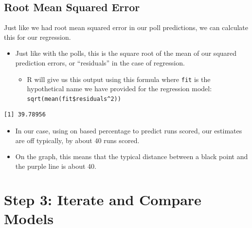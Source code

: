 \documentclass[
  letterpaper,
  DIV=11,
  numbers=noendperiod]{scrreprt}
\newenvironment{Shaded}{\begin{snugshade}}{\end{snugshade}}
\newcommand{\DecValTok}[1]{\textcolor[rgb]{0.68,0.00,0.00}{#1}}
\newcommand{\FunctionTok}[1]{\textcolor[rgb]{0.28,0.35,0.67}{#1}}
\newcommand{\NormalTok}[1]{\textcolor[rgb]{0.00,0.23,0.31}{#1}}
\newcommand{\SpecialCharTok}[1]{\textcolor[rgb]{0.37,0.37,0.37}{#1}}
\providecommand{\tightlist}{%
  \setlength{\itemsep}{0pt}\setlength{\parskip}{0pt}}\usepackage{longtable,booktabs,array}
\begin{document}
\hypertarget{root-mean-squared-error}{%
\subsection{Root Mean Squared Error}\label{root-mean-squared-error}}

Just like we had root mean squared error in our poll predictions, we can
calculate this for our regression.

\begin{itemize}
\tightlist
\item
  Just like with the polls, this is the square root of the mean of our
  squared prediction errors, or ``residuals'' in the case of regression.

  \begin{itemize}
  \tightlist
  \item
    R will give us this output using this formula where \texttt{fit} is
    the hypothetical name we have provided for the regression model:
    \texttt{sqrt(mean(fit\$residuals\^{}2))}
  \end{itemize}
\end{itemize}

\begin{Shaded}
\end{Shaded}

\begin{verbatim}
[1] 39.78956
\end{verbatim}

\begin{itemize}
\tightlist
\item
  In our case, using on based percentage to predict runs scored, our
  estimates are off typically, by about 40 runs scored.
\item
  On the graph, this means that the typical distance between a black
  point and the purple line is about 40.
\end{itemize}

\hypertarget{step-3-iterate-and-compare-models}{%
\section{Step 3: Iterate and Compare
Models}\label{step-3-iterate-and-compare-models}}
\end{document}
